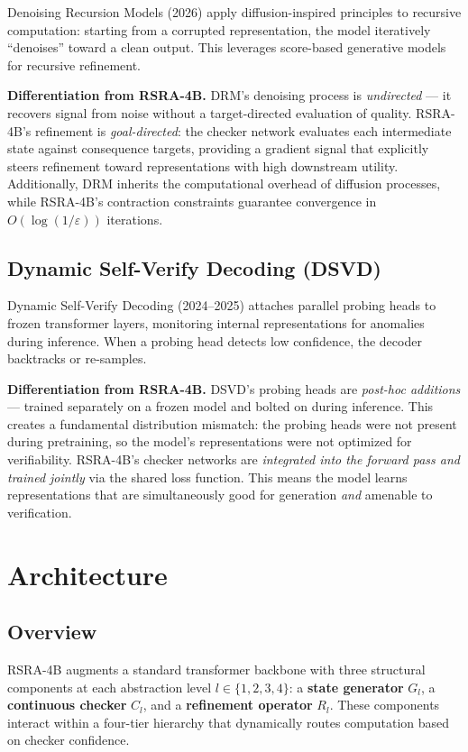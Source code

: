 \documentclass[11pt,a4paper]{article}
\theoremstyle{definition}
\begin{document}
Denoising Recursion Models (2026) apply diffusion-inspired principles to recursive computation: starting from a corrupted representation, the model iteratively ``denoises'' toward a clean output. This leverages score-based generative models for recursive refinement.

\textbf{Differentiation from RSRA-4B.} DRM's denoising process is \textit{undirected} --- it recovers signal from noise without a target-directed evaluation of quality. RSRA-4B's refinement is \textit{goal-directed}: the checker network evaluates each intermediate state against consequence targets, providing a gradient signal that explicitly steers refinement toward representations with high downstream utility. Additionally, DRM inherits the computational overhead of diffusion processes, while RSRA-4B's contraction constraints guarantee convergence in $O(\log(1/\varepsilon))$ iterations.

\subsection{Dynamic Self-Verify Decoding (DSVD)}

Dynamic Self-Verify Decoding (2024--2025) attaches parallel probing heads to frozen transformer layers, monitoring internal representations for anomalies during inference. When a probing head detects low confidence, the decoder backtracks or re-samples.

\textbf{Differentiation from RSRA-4B.} DSVD's probing heads are \textit{post-hoc additions} --- trained separately on a frozen model and bolted on during inference. This creates a fundamental distribution mismatch: the probing heads were not present during pretraining, so the model's representations were not optimized for verifiability. RSRA-4B's checker networks are \textit{integrated into the forward pass and trained jointly} via the shared loss function. This means the model learns representations that are simultaneously good for generation \textit{and} amenable to verification.

\section{Architecture}

\subsection{Overview}

RSRA-4B augments a standard transformer backbone with three structural components at each abstraction level $l \in \{1, 2, 3, 4\}$: a \textbf{state generator} $G_l$, a \textbf{continuous checker} $C_l$, and a \textbf{refinement operator} $R_l$. These components interact within a four-tier hierarchy that dynamically routes computation based on checker confidence.
\end{document}
